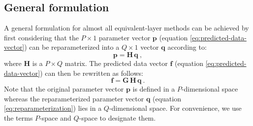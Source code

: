\documentclass[utf8]{FrontiersinHarvard} %
\begin{document}
	\subsection{General formulation}
	\label{subsec:general-formulation}
	
	A general formulation for almost all equivalent-layer methods can be achieved by first considering 
	that the $P \times 1$ parameter vector $\mathbf{p}$ (equation \ref{eq:predicted-data-vector}) can be reparameterized 
	into a $Q \times 1$ vector $\mathbf{q}$ according to:
	\begin{equation}
		\mathbf{p} = \mathbf{H} \, \mathbf{q} \: ,
		\label{eq:reparameterization}
	\end{equation}
	where $\mathbf{H}$ is a $P \times Q$ matrix.
	The predicted data vector $\mathbf{f}$ (equation \ref{eq:predicted-data-vector}) can then be
	rewritten as follows:
	\begin{equation}
		\mathbf{f} = \mathbf{G} \, \mathbf{H} \, \mathbf{q} \: .
		\label{eq:predicted-data-vetor-reparameterized}
	\end{equation}
	Note that the original parameter vector $\mathbf{p}$ is defined in a $P$-dimensional space whereas the reparameterized
	parameter vector $\mathbf{q}$ (equation \ref{eq:reparameterization}) lies in a $Q$-dimensional space.
	For convenience, we use the terms $P$-space and $Q$-space to designate them.
	
\end{document}
